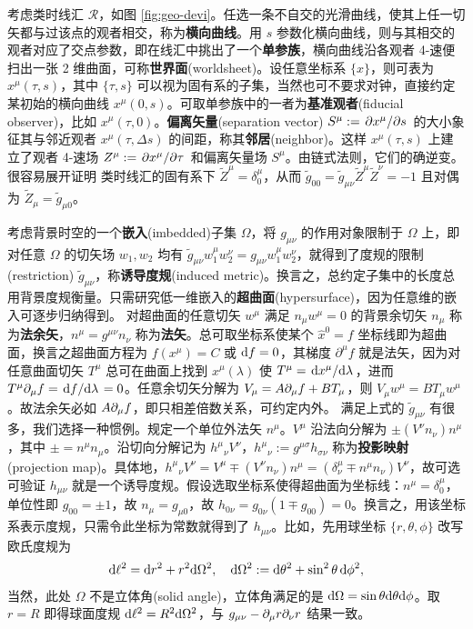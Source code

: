 考虑类时线汇 $\mathscr R$，如图 \ref{fig:geo-devi}。任选一条不自交的光滑曲线，使其上任一切矢都与过该点的观者相交，称为\textbf{横向曲线}。用 $s$ 参数化横向曲线，则与其相交的观者对应了交点参数，即在线汇中挑出了一个\textbf{单参族}，横向曲线沿各观者 4-速便扫出一张 2 维曲面，可称\textbf{世界面}(worldsheet)。设任意坐标系 $\{x\}$，则可表为 $x^\mu(\tau,s)$，其中 $\{\tau,s\}$ 可以视为固有系的子集，当然也可不要求对钟，直接约定某初始的横向曲线 $x^\mu(0,s)$。可取单参族中的一者为\textbf{基准观者}(fiducial observer)，比如 $x^\mu(\tau,0)$。\textbf{偏离矢量}(separation vector) $S^\mu:=\pdv*{x^\mu}{s}$ 的大小象征其与邻近观者 $x^\mu(\tau,\Delta s)$ 的间距，称其\textbf{邻居}(neighbor)。这样 $x^\mu(\tau,s)$ 上建立了观者 4-速场 $Z^\mu:=\pdv*{x^\mu}{\tau}$ 和偏离矢量场 $S^\mu$。由链式法则，它们的确逆变。
很容易展开证明
类时线汇的固有系下 $\tilde Z^\mu=\delta^\mu_0$，从而 $\tilde g_{0 0}=\tilde g_{\mu\nu}\tilde Z^\mu\tilde Z^\nu=-1$ 且对偶为 $\tilde Z_\mu = \tilde g_{\mu0}$。

考虑背景时空的一个\textbf{嵌入}(imbedded)子集 $\Omega$，将 $g_{\mu\nu}$ 的作用对象限制于 $\Omega$ 上，即对任意 $\Omega$ 的切矢场 $w_1,w_2$ 均有 $\tilde g_{\mu\nu}w_1^\mu w_2^\nu=g_{\mu\nu}w_1^\mu w_2^\nu$，就得到了度规的限制(restriction) $\tilde g_{\mu\nu}$，称\textbf{诱导度规}(induced metric)。换言之，总约定子集中的长度总用背景度规衡量。只需研究低一维嵌入的\textbf{超曲面}(hypersurface)，因为任意维的嵌入可逐步归纳得到。
对超曲面的任意切矢 $w^\mu$ 满足 $n_\mu w^\mu = 0$ 的背景余切矢 $n_\mu$ 称为\textbf{法余矢}，$n^\mu = g^{\mu\nu}n_\nu$ 称为\textbf{法矢}。总可取坐标系使某个 $\hat x^0=f$ 坐标线即为超曲面，换言之超曲面方程为 $f(x^\mu)=C$ 或 $\dd f=0$，其梯度 $\partial^\mu f$ 就是法矢，因为对任意曲面切矢 $T^\mu$ 总可在曲面上找到 $x^\mu(\lambda)$ 使 $T^\mu=\dv*{x^\mu}{\lambda}$，进而 $T^\mu\partial_\mu f=\dv*{f}{\lambda}=0$。任意余切矢分解为 $V_\mu = A \partial_\mu f + B T_\mu$，则 $V_\mu w^\mu = B T_\mu w^\mu$。故法余矢必如 $A \partial_\mu f$，即只相差倍数关系，可约定内外。
满足上式的 $\tilde g_{\mu\nu}$ 有很多，我们选择一种惯例。规定一个单位外法矢 $n^\mu$。$V^\mu$ 沿法向分解为 $\pm  (V^\nu n_\nu)  n^\mu$，其中 $\pm = n^\mu n_\mu$。沿切向分解记为 $h^\mu{}_\nu V^\nu$，$h^\mu{}_\nu:=g^{\mu\sigma}h_{\sigma\nu}$ 称为\textbf{投影映射}(projection map)。具体地，$h^\mu{}_\nu V^\nu=V^\mu \mp  (V^\nu n_\nu)  n^\mu = (\delta^\mu_\nu \mp n^\mu n_\nu)V^\nu$，故可选
可验证 $h_{\mu\nu}$ 就是一个诱导度规。假设选取坐标系使得超曲面为坐标线：$n^\mu = \delta^\mu_0$，单位性即 $g_{00}=\pm 1$，故 $n_\mu = g_{\mu 0}$，故 $h_{0\nu} = g_{0\nu}(1\mp g_{0 0})=0$。换言之，用该坐标系表示度规，只需令此坐标为常数就得到了 $h_{\mu\nu}$。比如，先用球坐标 $\{r,\theta,\phi\}$ 改写欧氏度规为
\[\dd\ell^2=\dd r^2+r^2\dd\Omega^2,\quad \dd\Omega^2:=\dd\theta^2+\sin^2\theta\,\dd\phi^2,\]
当然，此处 $\Omega$ 不是立体角(solid angle)，立体角满足的是 $\dd\Omega=\sin\theta \dd\theta\dd\phi$。取 $r=R$ 即得球面度规 $\dd\ell^2=R^2\dd\Omega^2$，与 $g_{\mu\nu} - \partial_\mu r \partial_\nu r$ 结果一致。

